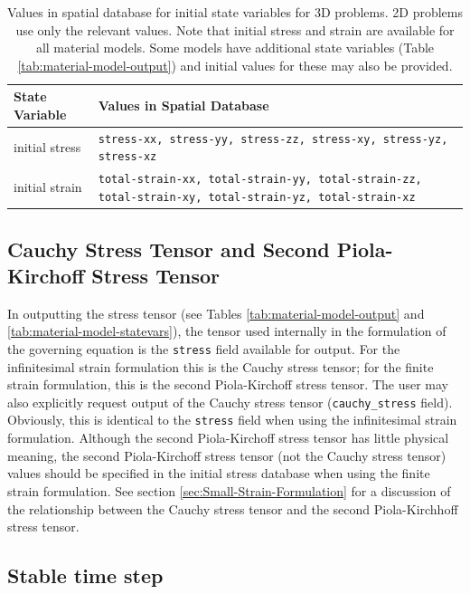 \noindent \begin{center}
\begin{table}[H]
\noindent \centering{}\caption{Values in spatial database for initial state variables for 3D problems.
2D problems use only the relevant values. Note that initial stress
and strain are available for all material models. Some models have
additional state variables (Table \ref{tab:material-model-output})
and initial values for these may also be provided.}
\begin{tabular}{|>{\centering}m{0.85in}|>{\centering}m{2.47in}|}
\hline 
\textbf{State Variable} & \centering{}\textbf{Values in Spatial Database}\tabularnewline
\hline 
\hline 
initial stress & \texttt{stress-xx, stress-yy, stress-zz, stress-xy, stress-yz, stress-xz}\tabularnewline
\hline 
initial strain & \texttt{total-strain-xx, total-strain-yy, total-strain-zz, total-strain-xy,
total-strain-yz, total-strain-xz}\tabularnewline
\hline 
\end{tabular}
\end{table}

\par\end{center}


\subsection{Cauchy Stress Tensor and Second Piola-Kirchoff Stress Tensor}

In outputting the stress tensor (see Tables \ref{tab:material-model-output}
and \ref{tab:material-model-statevars}), the tensor used internally
in the formulation of the governing equation is the \texttt{stress}
field available for output. For the infinitesimal strain formulation
this is the Cauchy stress tensor; for the finite strain formulation,
this is the second Piola-Kirchoff stress tensor. The user may also
explicitly request output of the Cauchy stress tensor (\texttt{cauchy\_stress}
field). Obviously, this is identical to the \texttt{stress} field
when using the infinitesimal strain formulation. Although the second
Piola-Kirchoff stress tensor has little physical meaning, the second
Piola-Kirchoff stress tensor (not the Cauchy stress tensor) values
should be specified in the initial stress database when using the
finite strain formulation. See section \ref{sec:Small-Strain-Formulation}
for a discussion of the relationship between the Cauchy stress tensor
and the second Piola-Kirchhoff stress tensor.


\subsection{\label{sub:Stable-time-step}Stable time step}

